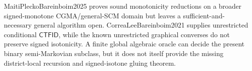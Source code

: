 MaitiPleckoBareinboim2025 proves sound monotonicity reductions on a broader signed-monotone CGMA/general-SCM domain but leaves a sufficient-and-necessary general algorithm open.  CorreaLeeBareinboim2021 supplies unrestricted conditional \(\mathsf{CTFID}\), while the known unrestricted graphical converses do not preserve signed isotonicity.  A finite global algebraic oracle can decide the present binary semi-Markovian subclass, but it does not itself provide the missing district-local recursion and signed-isotone gluing theorem.